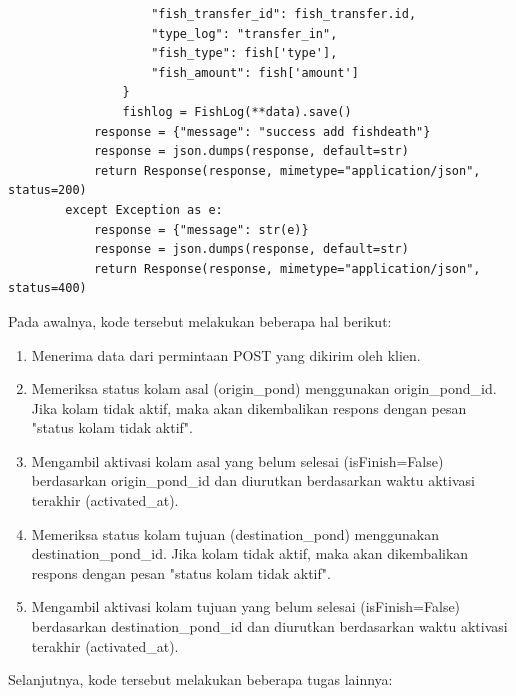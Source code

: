 \begin{enumerate}[1.]
\begin{lstlisting}
                    "fish_transfer_id": fish_transfer.id,
                    "type_log": "transfer_in",
                    "fish_type": fish['type'],
                    "fish_amount": fish['amount']
                }
                fishlog = FishLog(**data).save()
            response = {"message": "success add fishdeath"}
            response = json.dumps(response, default=str)
            return Response(response, mimetype="application/json", status=200)
        except Exception as e:
            response = {"message": str(e)}
            response = json.dumps(response, default=str)
            return Response(response, mimetype="application/json", status=400)
\end{lstlisting}

Pada awalnya, kode tersebut melakukan beberapa hal berikut:

\begin{enumerate}[(1)]
\item Menerima data dari permintaan POST yang dikirim oleh klien.
\item Memeriksa status kolam asal (origin\_pond) menggunakan origin\_pond\_id. Jika kolam tidak aktif, maka akan dikembalikan respons dengan pesan "status kolam tidak aktif".
\item Mengambil aktivasi kolam asal yang belum selesai (isFinish=False) berdasarkan origin\_pond\_id dan diurutkan berdasarkan waktu aktivasi terakhir (activated\_at).
\item Memeriksa status kolam tujuan (destination\_pond) menggunakan destination\_pond\_id. Jika kolam tidak aktif, maka akan dikembalikan respons dengan pesan "status kolam tidak aktif".
\item Mengambil aktivasi kolam tujuan yang belum selesai (isFinish=False) berdasarkan destination\_pond\_id dan diurutkan berdasarkan waktu aktivasi terakhir (activated\_at).
\end{enumerate}

Selanjutnya, kode tersebut melakukan beberapa tugas lainnya:


\end{enumerate}
